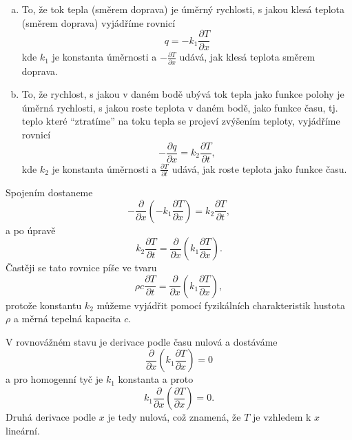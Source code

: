\begin{enumerate}[a)]
\item To, že tok tepla (směrem doprava) je úměrný rychlosti, s jakou klesá
  teplota (směrem doprava) vyjádříme rovnicí
  \begin{equation*}
    q=-k_1\frac {\partial T}{\partial x}
  \end{equation*}
  kde $k_1$ je konstanta úměrnosti a $-\frac {\partial T}{\partial x}$ udává, jak klesá teplota směrem doprava.
\item To, že rychlost, s jakou v daném bodě ubývá tok tepla jako funkce polohy je úměrná rychlosti, s jakou roste teplota v daném bodě, jako funkce času, tj. teplo které ``ztratíme'' na toku tepla se projeví zvýšením teploty, vyjádříme rovnicí
  \begin{equation*}
-\frac{\partial q}{\partial x} = k_2    \frac{\partial T}{\partial t},
  \end{equation*}
  kde $k_2$ je konstanta úměrnosti a $\frac {\partial T}{\partial t}$ udává, jak roste teplota jako funkce času.    
\end{enumerate}
Spojením dostaneme
  \begin{equation*}
-\frac{\partial }{\partial x}
\left( -k_1\frac {\partial T}{\partial x} \right)  = k_2 \frac{\partial T}{\partial t}  ,
  \end{equation*}
  a po úpravě
  \begin{equation*}
  k_2  \frac{\partial T}{\partial t} = \frac{\partial }{\partial x}
\left( k_1\frac {\partial T}{\partial x} \right).    
\end{equation*}
Častěji se tato rovnice píše ve tvaru 
  \begin{equation*}
\rho c  \frac{\partial T}{\partial t} = \frac{\partial }{\partial x}
\left( k_1\frac {\partial T}{\partial x} \right),    
\end{equation*}
protože konstantu ${k_2}$ můžeme vyjádřit pomocí fyzikálních charakteristik hustota $\rho$ a měrná tepelná kapacita $c$.

V rovnovážném stavu je derivace podle času nulová a dostáváme
  \begin{equation*}
\frac{\partial }{\partial x}
\left( k_1\frac {\partial T}{\partial x} \right)=0
\end{equation*}
a pro homogenní tyč je $k_1$ konstanta a proto 
  \begin{equation*}
k_1 \frac{\partial }{\partial x}
\left( \frac {\partial T}{\partial x} \right)=0.
\end{equation*}
Druhá derivace podle $x$ je tedy nulová, což znamená, že $T$  je vzhledem k $x$ lineární.


